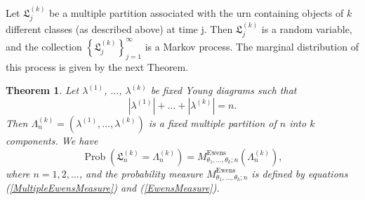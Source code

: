 \documentclass[12pt]{amsart}
\newtheorem{thm}{Theorem}[section]
\theoremstyle{definition}
\numberwithin{equation}{section}
\DeclareMathOperator{\Prob}{Prob}
\DeclareMathOperator{\Ewens}{Ewens}
\begin{document}
Let $\mathfrak{L}_j^{(k)}$ be a multiple partition associated
with the urn containing objects of $k$ different classes (as described above) at time j. Then $\mathfrak{L}_j^{(k)}$ is a random variable, and
the collection $\left\{\mathfrak{L}_j^{(k)}\right\}_{j=1}^{\infty}$
is a Markov process. The marginal distribution of this process
is given by the next Theorem.
\begin{thm}\label{TheoremGeneralizedHoope}
Let $\lambda^{(1)}$, $\ldots$, $\lambda^{(k)}$ be fixed
Young diagrams such that
$$
\left|\lambda^{(1)}\right|+\ldots+\left|\lambda^{(k)}\right|=n.
$$
Then $\Lambda_n^{(k)}=\left(\lambda^{(1)},\ldots,\lambda^{(k)}\right)$ is a fixed multiple partition of $n$ into $k$ components. We have
\begin{equation}
\Prob\left(\mathfrak{L}_n^{(k)}=\Lambda_n^{(k)}\right)=M_{\theta_1,\ldots,\theta_k;n}^{\Ewens}\left(\Lambda_n^{(k)}\right),
\end{equation}
where $n=1,2,\ldots$, and the probability measure $M_{\theta_1,\ldots,\theta_k;n}^{\Ewens}$ is defined by equations (\ref{MultipleEwensMeasure}) and (\ref{EwensMeasure}).
\end{thm}
\end{document}
